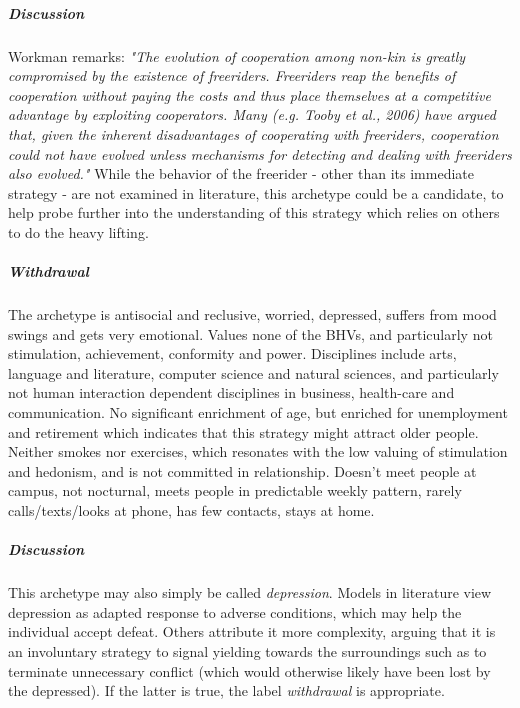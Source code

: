 	\subparagraph{\textnormal{\textit{Discussion}}}
	Workman remarks:
	\textit{"The evolution of cooperation among non-kin is greatly compromised by the existence of freeriders. Freeriders reap the benefits of cooperation without paying the costs and thus place themselves at a competitive advantage by exploiting cooperators. Many (e.g. Tooby et al., 2006) have argued that, given the inherent disadvantages of cooperating with freeriders, cooperation could not have evolved unless mechanisms for detecting and dealing with freeriders also evolved."}
	While the behavior of the freerider - other than its immediate strategy - are not examined in literature, this archetype could be a candidate, to help probe further into the understanding of this strategy which relies on others to do the heavy lifting.

\subparagraph*{Withdrawal}
The \follower archetype is antisocial and reclusive, worried, depressed, suffers from mood swings and gets very emotional.
Values none of the BHVs, and particularly not stimulation, achievement, conformity and power.
Disciplines include arts, language and literature, computer science and natural sciences, and particularly not human interaction dependent disciplines in business, health-care and communication.
No significant enrichment of age, but enriched for unemployment and retirement which indicates that this strategy might attract older people.
Neither smokes nor exercises, which resonates with the low valuing of stimulation and hedonism, and is not committed in relationship.
Doesn't meet people at campus, not nocturnal, meets people in predictable weekly pattern, rarely calls/texts/looks at phone, has few contacts, stays at home.

	\subparagraph{\textnormal{\textit{Discussion}}}
	This archetype may also simply be called \textit{depression}. Models in literature view depression as adapted response to adverse conditions, which may help the individual accept defeat.
	Others attribute it more complexity, arguing that it is an involuntary strategy to signal yielding towards the surroundings such as to terminate unnecessary conflict (which would otherwise likely have been lost by the depressed). If the latter is true, the label \textit{withdrawal} is appropriate.
